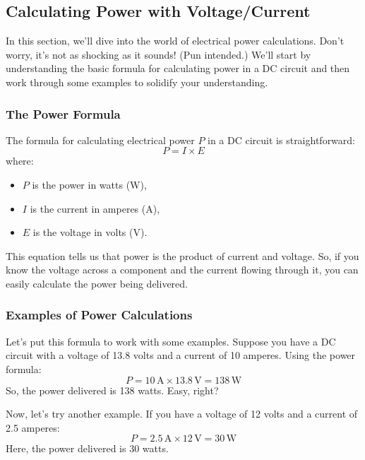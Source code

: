 \subsection{Calculating Power with Voltage/Current}
\label{subsec:calc-power}

In this section, we'll dive into the world of electrical power calculations. Don't worry, it's not as shocking as it sounds! (Pun intended.) We'll start by understanding the basic formula for calculating power in a DC circuit and then work through some examples to solidify your understanding.

\subsubsection*{The Power Formula}
The formula for calculating electrical power \( P \) in a DC circuit is straightforward:
\begin{equation}
    P = I \times E
    \label{eq:power-formula}
\end{equation}
where:
\begin{itemize}
    \item \( P \) is the power in watts (W),
    \item \( I \) is the current in amperes (A),
    \item \( E \) is the voltage in volts (V).
\end{itemize}

This equation tells us that power is the product of current and voltage. So, if you know the voltage across a component and the current flowing through it, you can easily calculate the power being delivered.

\subsubsection*{Examples of Power Calculations}
Let's put this formula to work with some examples. Suppose you have a DC circuit with a voltage of 13.8 volts and a current of 10 amperes. Using the power formula:
\begin{equation}
    P = 10 \, \text{A} \times 13.8 \, \text{V} = 138 \, \text{W}
    \label{eq:power-example1}
\end{equation}
So, the power delivered is 138 watts. Easy, right?

Now, let's try another example. If you have a voltage of 12 volts and a current of 2.5 amperes:
\begin{equation}
    P = 2.5 \, \text{A} \times 12 \, \text{V} = 30 \, \text{W}
    \label{eq:power-example2}
\end{equation}
Here, the power delivered is 30 watts.

